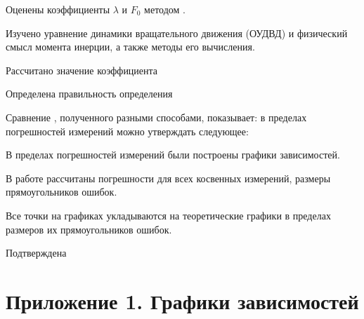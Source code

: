 Оценены коэффициенты $\lambda$  и $F_0$ методом .

Изучено уравнение динамики вращательного движения (ОУДВД) и физический смысл момента инерции, а также методы его вычисления.

Рассчитано значение коэффициента 

Определена правильность определения

Сравнение , полученного разными способами, показывает: в пределах погрешностей измерений можно утверждать следующее: 


В пределах погрешностей измерений были построены графики зависимостей.

В работе рассчитаны погрешности для всех косвенных измерений, размеры прямоугольников ошибок. 

Все точки на графиках укладываются на  теоретические графики в пределах размеров их прямоугольников ошибок.

Подтверждена 

\newpage
\section*{Приложение 1. Графики зависимостей} %
\label{sec:figures}



